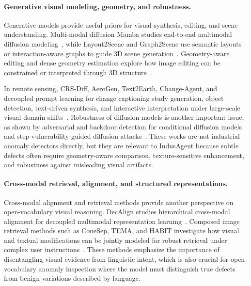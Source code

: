 \documentclass{llmxive}
\begin{document}
{\paragraph{Generative visual modeling, geometry, and robustness.}
Generative models provide useful priors for visual synthesis, editing, and scene understanding. Multi-modal diffusion Mamba studies end-to-end multimodal diffusion modeling~\citep{lu2025end}, while Layout2Scene and Graph2Scene use semantic layouts or interaction-aware graphs to guide 3D scene generation~\citep{chen2025layout2scene, chen2025graph2scene}. Geometry-aware editing and dense geometry estimation explore how image editing can be constrained or interpreted through 3D structure~\citep{wang2026geometry, wang2025editor}. 

In remote sensing, CRS-Diff, AeroGen, Text2Earth, Change-Agent, and decoupled prompt learning for change captioning study generation, object detection, text-driven synthesis, and interactive interpretation under large-scale visual-domain shifts~\citep{tang2024crs, tang2025aerogen, liu2025text2earth, liu2024changeagent, liu2023decoupling}. Robustness of diffusion models is another important issue, as shown by adversarial and backdoor detection for conditional diffusion models and step-vulnerability-guided diffusion attacks~\citep{yu2025dadet, yu2024step}. These works are not industrial anomaly detectors directly, but they are relevant to IndusAgent because subtle defects often require geometry-aware comparison, texture-sensitive enhancement, and robustness against misleading visual artifacts.

\paragraph{Cross-modal retrieval, alignment, and structured representations.}
Cross-modal alignment and retrieval methods provide another perspective on open-vocabulary visual reasoning. DecAlign studies hierarchical cross-modal alignment for decoupled multimodal representation learning~\citep{qian2025decalign}. Composed image retrieval methods such as ConeSep, TEMA, and HABIT investigate how visual and textual modifications can be jointly modeled for robust retrieval under complex user instructions~\citep{ConeSep, TEMA, HABIT}. These methods emphasize the importance of disentangling visual evidence from linguistic intent, which is also crucial for open-vocabulary anomaly inspection where the model must distinguish true defects from benign variations described by language.

}
\end{document}
